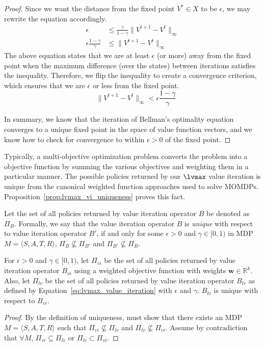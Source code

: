 \begin{proof}
Since we want the distance from the fixed point $V^* \in X$ to be $\epsilon$, we may rewrite the equation accordingly.
\begin{align*}
    \epsilon &\leq \frac{\gamma}{1 - \gamma} \| V^{t+1} - V^t \|_\infty \\
    \epsilon \frac{1 - \gamma}{\gamma} &\leq \| V^{t+1} - V^t \|_\infty
\end{align*}
The above equation states that we are at least $\epsilon$ (or more) away from the fixed point when the maximum difference (over the states) between iterations satisfies the inequality. Therefore, we flip the inequality to create a convergence criterion, which ensures that we are $\epsilon$ or less from the fixed point.
\begin{equation*}
    \quad \| V^{t+1} - V^t \|_\infty < \epsilon \frac{1 - \gamma}{\gamma}
\end{equation*}

In summary, we know that the iteration of Bellman's optimality equation converges to a unique fixed point in the space of value function vectors, and we know how to check for convergence to within $\epsilon > 0$ of the fixed point.
\end{proof}

Typically, a multi-objective optimization problem converts the problem into a objective function by summing the various objectives and weighting them in a particular manner. The possible policies returned by our $\lvmax$ value iteration is unique from the canonical weighted function approaches used to solve MOMDPs. Proposition~\ref{prop:lvmax_vi_uniqueness} proves this fact.

Let the set of all policies returned by value iteration operator $B$ be denoted as $\Pi_B$. Formally, we say that the value iteration operator $B$ is \emph{unique} with respect to value iteration operator $B'$, if and only for some $\epsilon > 0$ and $\gamma \in [0, 1)$ in MDP $M = \langle S, A, T, R \rangle$, $\Pi_B \not\subseteq \Pi_{B'}$ and $\Pi_{B'} \not\subseteq \Pi_B$.

\begin{proposition}
    \label{prop:lvmax_vi_uniqueness}
    For $\epsilon > 0$ and $\gamma \in [0, 1)$, let $\Pi_{vi}$ be the set of all policies returned by value iteration operator $B_{vi}$ using a weighted objective function with weights $\mathbf{w} \in \mathbb{R}^k$. Also, let $\Pi_{lv}$ be the set of all policies returned by value iteration operator $B_{lv}$ as defined by Equation~\ref{eq:lvmax_value_iteration} with $\epsilon$ and $\gamma$. $B_{lv}$ is unique with respect to $B_{vi}$.
\end{proposition}

\begin{proof}
By the definition of uniqueness, must show that there exists an MDP $M = \langle S, A, T, R \rangle$ such that $\Pi_{vi} \not\subseteq \Pi_{lv}$ and $\Pi_{lv} \not\subseteq \Pi_{vi}$. Assume by contradiction that $\forall M$, $\Pi_{vi} \subseteq \Pi_{lv}$ or $\Pi_{lv} \subset \Pi_{vi}$.

\end{proof}
